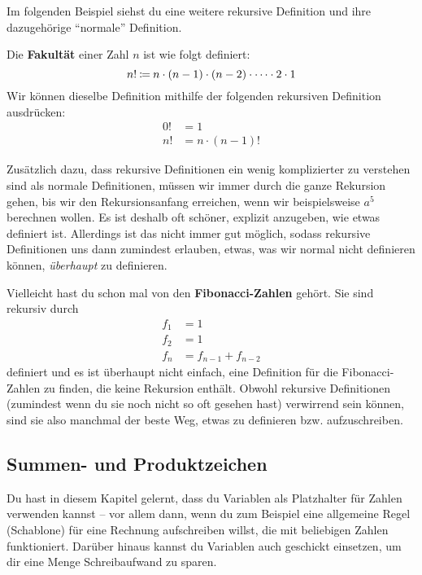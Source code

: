 \documentclass[../../main.tex]{subfiles}
\begin{document}
Im folgenden Beispiel siehst du eine weitere rekursive Definition und ihre dazugehörige \enquote{normale} Definition.
\begin{example}{}
    Die \textbf{Fakultät} einer Zahl $n$ ist wie folgt definiert:
    \[n!\mathbin{\coloneqq} n\cdot (n-1)\cdot (n-2)\cdot\dots\cdot2\cdot 1\]
    Wir können dieselbe Definition mithilfe der folgenden rekursiven Definition ausdrücken:
    \begin{align*}
        0!&=1\\
        n!&=n\cdot(n-1)!
    \end{align*}
\end{example}
Zusätzlich dazu, dass rekursive Definitionen ein wenig komplizierter zu verstehen sind als normale Definitionen, müssen
wir immer durch die ganze Rekursion gehen, bis wir den Rekursionsanfang erreichen, wenn wir beispielsweise $a^5$
berechnen wollen. Es ist deshalb oft schöner, explizit anzugeben, wie etwas definiert ist. Allerdings ist das nicht
immer gut möglich, sodass rekursive Definitionen uns dann zumindest erlauben, etwas, was wir normal nicht definieren
können, \emph{überhaupt} zu definieren.
\begin{example}{}
    Vielleicht hast du schon mal von den \textbf{Fibonacci-Zahlen} gehört. Sie sind rekursiv durch
    \begin{align*}
        f_1 &= 1\\
        f_2 &= 1\\
        f_n &= f_{n-1}+f_{n-2}
    \end{align*}
    definiert und es ist überhaupt nicht einfach, eine Definition für die Fibonacci-Zahlen zu finden, die keine
    Rekursion enthält. Obwohl rekursive Definitionen (zumindest wenn du sie noch nicht so oft gesehen hast) verwirrend
    sein können, sind sie also manchmal der beste Weg, etwas zu definieren bzw. aufzuschreiben.
\end{example}

\subsection*{Summen- und Produktzeichen}
Du hast in diesem Kapitel gelernt, dass du Variablen als Platzhalter für Zahlen verwenden kannst -- vor allem dann, wenn
du zum Beispiel eine allgemeine Regel (Schablone) für eine Rechnung aufschreiben willst, die mit beliebigen Zahlen
funktioniert. Darüber hinaus kannst du Variablen auch geschickt einsetzen, um dir eine Menge Schreibaufwand zu sparen.
\end{document}
